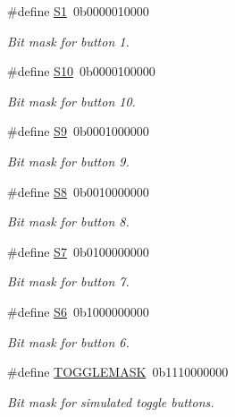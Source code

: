 \begin{DoxyCompactItemize}
\#define \hyperlink{group__buttons_ga690d30e9ad3647835c243368b36d4c41}{S1}~0b0000010000
\begin{DoxyCompactList}\small\item\em Bit mask for button 1. \end{DoxyCompactList}\item 
\#define \hyperlink{group__buttons_ga1ff88b4fe56e1c80a371b1fbda4e4e74}{S10}~0b0000100000
\begin{DoxyCompactList}\small\item\em Bit mask for button 10. \end{DoxyCompactList}\item 
\#define \hyperlink{group__buttons_ga6eef6bdffd8bac54d6b4be0176dd20ff}{S9}~0b0001000000
\begin{DoxyCompactList}\small\item\em Bit mask for button 9. \end{DoxyCompactList}\item 
\#define \hyperlink{group__buttons_ga4516955061f24ae7162de20aff005c9b}{S8}~0b0010000000
\begin{DoxyCompactList}\small\item\em Bit mask for button 8. \end{DoxyCompactList}\item 
\#define \hyperlink{group__buttons_ga6580eeddd36d0d97cdde6f6a4695ed12}{S7}~0b0100000000
\begin{DoxyCompactList}\small\item\em Bit mask for button 7. \end{DoxyCompactList}\item 
\#define \hyperlink{group__buttons_gab86bfbee3d71830e88c61a3f8d5aebf4}{S6}~0b1000000000
\begin{DoxyCompactList}\small\item\em Bit mask for button 6. \end{DoxyCompactList}\item 
\#define \hyperlink{group__buttons_ga77a6549a849f9a9472a367e4148289b7}{T\+O\+G\+G\+L\+E\+M\+A\+SK}~0b1110000000
\begin{DoxyCompactList}\small\item\em Bit mask for simulated toggle buttons. \end{DoxyCompactList}\end{DoxyCompactItemize}
